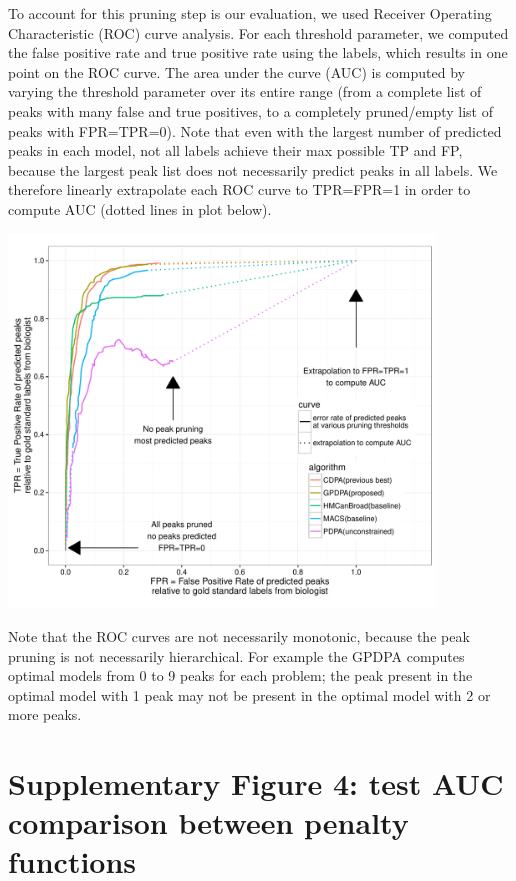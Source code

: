 \documentclass{article}
\begin{document}
To account for this pruning step is our evaluation, we used Receiver
Operating Characteristic (ROC) curve analysis. For each threshold
parameter, we computed the false positive rate and true positive rate
using the labels, which results in one point on the ROC curve. The
area under the curve (AUC) is computed by varying the threshold
parameter over its entire range (from a complete list of peaks with
many false and true positives, to a completely pruned/empty list of
peaks with FPR=TPR=0). Note that even with the largest number of
predicted peaks in each model, not all labels achieve their max
possible TP and FP, because the largest peak list does not necessarily
predict peaks in all labels. We therefore linearly extrapolate each
ROC curve to TPR=FPR=1 in order to compute AUC (dotted lines in plot
below). 

\begin{center}
  \includegraphics[width=0.85\textwidth]{figure-test-error-dots-ROC-supp.pdf}
\end{center}

Note that the ROC curves are not necessarily monotonic, because the
peak pruning is not necessarily hierarchical. For example the GPDPA
computes optimal models from 0 to 9 peaks for each problem; the peak
present in the optimal model with 1 peak may not be present in the
optimal model with 2 or more peaks.

\section*{Supplementary Figure 4: test AUC comparison between penalty functions}
\end{document}
